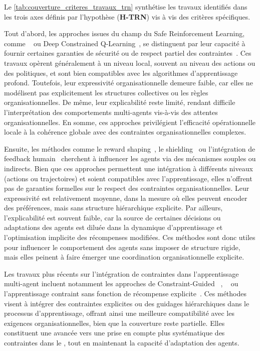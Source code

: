 Le \autoref{tab:couverture_criteres_travaux_trn} synthétise les travaux identifiés dans les trois axes définis par l'hypothèse (\textbf{H-TRN}) vis à vis des critères spécifiques.

Tout d'abord, les approches issues du champ du Safe Reinforcement Learning, comme ~\cite{achiam2017constrained} ou Deep Constrained Q-Learning~\cite{kalweit2020deep}, se distinguent par leur capacité à fournir certaines garanties de sécurité ou de respect partiel des contraintes~\cite{garcia2015comprehensive}. Ces travaux opèrent généralement à un niveau local, souvent au niveau des actions ou des politiques, et sont bien compatibles avec les algorithmes d'apprentissage profond. Toutefois, leur expressivité organisationnelle demeure faible, car elles ne modélisent pas explicitement les structures collectives ou les règles organisationnelles. De même, leur explicabilité reste limité, rendant difficile l'interprétation des comportements multi-agents vis-à-vis des attentes organisationnelles. En somme, ces approches privilégient l'efficacité opérationnelle locale à la cohérence globale avec des contraintes organisationnelles complexes.

Ensuite, les méthodes comme le reward shaping~\cite{ng1999policy}, le shielding~\cite{amodei2016concrete} ou l'intégration de feedback humain~\cite{warnell2018deep, zhou2025mentor} cherchent à influencer les agents via des mécanismes souples ou indirects. Bien que ces approches permettent une intégration à différents niveaux (actions ou trajectoires) et soient compatibles avec l'apprentissage, elles n'offrent pas de garanties formelles sur le respect des contraintes organisationnelles. Leur expressivité est relativement moyenne, dans la mesure où elles peuvent encoder des préférences, mais sans structure hiérarchique explicite. Par ailleurs, l'explicabilité est souvent faible, car la source de certaines décisions ou adaptations des agents est diluée dans la dynamique d'apprentissage et l'optimisation implicite des récompenses modifiées. Ces méthodes sont donc utiles pour influencer le comportement des agents sans imposer de structure rigide, mais elles peinent à faire émerger une coordination organisationnelle explicite.

Les travaux plus récents sur l'intégration de contraintes dans l'apprentissage multi-agent incluent notamment les approches de Constraint-Guided ~\cite{spieker2021constraint}, ~\cite{zhou2025mentor} ou l'apprentissage contraint sans fonction de récompense explicite~\cite{miryoosefi2022}. Ces méthodes visent à intégrer des contraintes explicites ou des guidages hiérarchiques dans le processus d'apprentissage, offrant ainsi une meilleure compatibilité avec les exigences organisationnelles, bien que la couverture reste partielle. Elles constituent une avancée vers une prise en compte plus systématique des contraintes dans le , tout en maintenant la capacité d'adaptation des agents.

